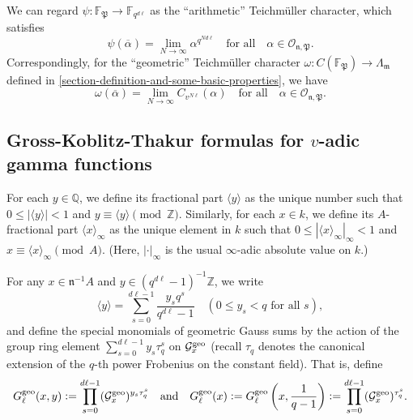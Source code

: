 \documentclass[11pt]{amsart}
\theoremstyle{plain}
\theoremstyle{definition}
\theoremstyle{remark}
\numberwithin{equation}{section}
\newcommand{\ZZ}{\mathbb{Z}}
\newcommand{\QQ}{\mathbb{Q}}
\newcommand{\FF}{\mathbb{F}}
\newcommand{\mfk}{\mathfrak{m}}
\newcommand{\nfk}{\mathfrak{n}}
\newcommand{\Pfk}{\mathfrak{P}}
\newcommand{\Gcal}{\mathcal{G}}
\newcommand{\Ocal}{\mathcal{O}}
\newcommand{\ovl}{\overline}
\newcommand{\ang}[1]{\langle #1 \rangle}
\newcommand{\anginf}[1]{\langle #1 \rangle_\infty}
\newcommand{\Fqdl}{\FF_{q^{d\l}}}
\newcommand{\bggs}{\Gcal^{\textnormal{geo}}}
\newcommand{\ggs}{G_\l^{\textnormal{geo}}}
\let\l\ell
\begin{document}
	We can regard $\psi: \FF_{\Pfk} \to \Fqdl$ as the “arithmetic” Teichmüller character, which satisfies
	\begin{equation}   \label{ari-teichmüller}
		\psi(\ovl{\alpha}) = \lim_{N \to \infty} \alpha^{q^{Nd\l}}
		\quad
		\text{for all}
		\quad
		\alpha \in \Ocal_{\nfk,\Pfk}.
	\end{equation}
	Correspondingly, for the “geometric” Teichmüller character $\omega: C(\FF_{\Pfk}) \to \Lambda_{\mfk}$ defined in \ref{section-definition-and-some-basic-properties}, we have
	\begin{equation}    \label{geo-teichmüller}
		\omega(\ovl{\alpha}) = \lim_{N \to \infty} C_{v^{N\l}} (\alpha)
		\quad
		\text{for all}
		\quad
		\alpha \in \Ocal_{\nfk,\Pfk}.
	\end{equation}
	
	\subsection{Gross-Koblitz-Thakur formulas for \texorpdfstring{$v$}{v}-adic gamma functions}     \label{section-gkt-formulas-for-v-adic-gamma-functions}
	
	For each $y \in \QQ$, we define its fractional part $\ang{y}$ as the unique number such that $0 \leq |\ang{y}| <1$ and $y \equiv \ang{y} \pmod{\ZZ}$.
	Similarly, for each $x \in k$, we define its $A$-fractional part $\anginf{x}$ as the unique element in $k$ such that $0 \leq |\anginf{x}|_\infty < 1$ and $x \equiv \anginf{x} \pmod{A}$.
	(Here, $|\cdot|_\infty$ is the usual $\infty$-adic absolute value on $k$.)
	
	For any $x \in \nfk^{-1} A$ and $y \in (q^{d\l}-1)^{-1} \ZZ$, we write
	$$
	\ang{y} = \sum_{s=0}^{d\l-1} \frac{y_s q^s}{q^{d\l}-1}
	\quad
	(0 \leq y_s < q \text{ for all } s),
	$$
	and define the special monomials of geometric Gauss sums by the action of the group ring element $\sum_{s=0}^{d\l-1} y_s \tau_q^s$ on $\bggs_x$ (recall $\tau_q$ denotes the canonical extension of the $q$-th power Frobenius on the constant field).
	That is, define
	\begin{equation}    \label{product-of-ggs}
		\ggs(x,y) := \prod_{s=0}^{d\l-1} (\bggs_x)^{y_s \tau_q^s}
		\quad
		\text{and}
		\quad
		\ggs(x)
		:= \ggs \left(x , \frac{1}{q-1} \right)
		:= \prod_{s=0}^{d\l-1} (\bggs_x)^{\tau_q^s}.
	\end{equation}
	
\end{document}
